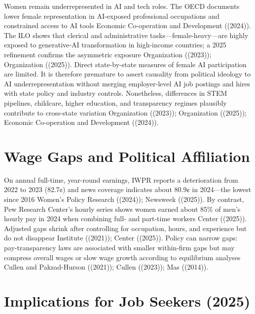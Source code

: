 \documentclass[
  letterpaper,
  DIV=11,
  numbers=noendperiod]{scrartcl}
\begin{document}
Women remain underrepresented in AI and tech roles. The OECD documents
lower female representation in AI-exposed professional occupations and
constrained access to AI tools Economic Co-operation and Development
((2024)). The ILO shows that clerical and administrative
tasks---female-heavy---are highly exposed to generative-AI
transformation in high-income countries; a 2025 refinement confirms the
asymmetric exposure Organization ((2023)); Organization ((2025)). Direct
state-by-state measures of female AI participation are limited. It is
therefore premature to assert causality from political ideology to AI
underrepresentation without merging employer-level AI job postings and
hires with state policy and industry controls. Nonetheless, differences
in STEM pipelines, childcare, higher education, and transparency regimes
plausibly contribute to cross-state variation Organization ((2023));
Organization ((2025)); Economic Co-operation and Development ((2024)).

\section{Wage Gaps and Political
Affiliation}\label{wage-gaps-and-political-affiliation}

On annual full-time, year-round earnings, IWPR reports a deterioration
from 2022 to 2023 (82.7¢) and news coverage indicates about 80.9¢ in
2024---the lowest since 2016 Women's Policy Research ((2024)); Newsweek
((2025)). By contrast, Pew Research Center's hourly series shows women
earned about 85\% of men's hourly pay in 2024 when combining full- and
part-time workers Center ((2025)). Adjusted gaps shrink after
controlling for occupation, hours, and experience but do not disappear
Institute ((2021)); Center ((2025)). Policy can narrow gaps:
pay-transparency laws are associated with smaller within-firm gaps but
may compress overall wages or slow wage growth according to equilibrium
analyses Cullen and Pakzad-Hurson ((2021)); Cullen ((2023)); Mas
((2014)).

\section{Implications for Job Seekers
(2025)}\label{implications-for-job-seekers-2025}
\end{document}
